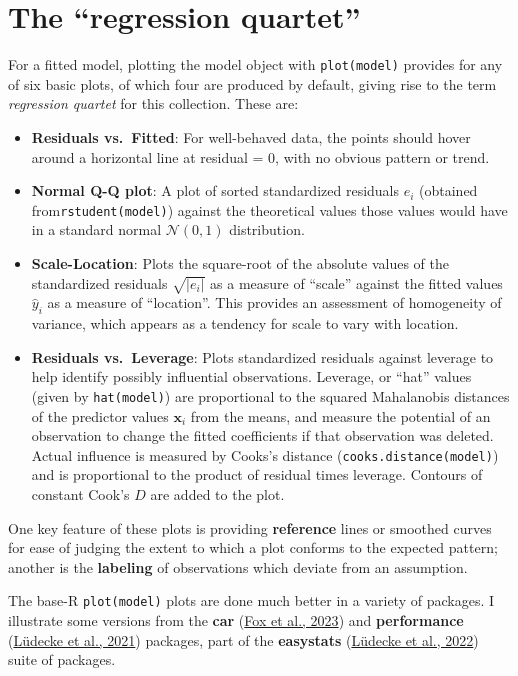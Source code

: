 \documentclass[
  letterpaper,
  10pt,
  krantz2]{krantz}
\begin{document}
\hypertarget{the-regression-quartet}{%
\section{The ``regression quartet''}\label{the-regression-quartet}}

For a fitted model, plotting the model object with \texttt{plot(model)}
provides for any of six basic plots, of which four are produced by
default, giving rise to the term \emph{regression quartet} for this
collection. These are:

\begin{itemize}
\item
  \textbf{Residuals vs.~Fitted}: For well-behaved data, the points
  should hover around a horizontal line at residual = 0, with no obvious
  pattern or trend.
\item
  \textbf{Normal Q-Q plot}: A plot of sorted standardized residuals
  \(e_i\) (obtained from\texttt{rstudent(model)}) against the
  theoretical values those values would have in a standard normal
  \(\mathcal{N}(0, 1)\) distribution.
\item
  \textbf{Scale-Location}: Plots the square-root of the absolute values
  of the standardized residuals \(\sqrt{| e_i |}\) as a measure of
  ``scale'' against the fitted values \(\hat{y}_i\) as a measure of
  ``location''. This provides an assessment of homogeneity of variance,
  which appears as a tendency for scale to vary with location.
\item
  \textbf{Residuals vs.~Leverage}: Plots standardized residuals against
  leverage to help identify possibly influential observations. Leverage,
  or ``hat'' values (given by \texttt{hat(model)}) are proportional to
  the squared Mahalanobis distances of the predictor values
  \(\mathbf{x}_i\) from the means, and measure the potential of an
  observation to change the fitted coefficients if that observation was
  deleted. Actual influence is measured by Cooks's distance
  (\texttt{cooks.distance(model)}) and is proportional to the product of
  residual times leverage. Contours of constant Cook's \(D\) are added
  to the plot.
\end{itemize}

One key feature of these plots is providing \textbf{reference} lines or
smoothed curves for ease of judging the extent to which a plot conforms
to the expected pattern; another is the \textbf{labeling} of
observations which deviate from an assumption.

The base-R \texttt{plot(model)} plots are done much better in a variety
of packages. I illustrate some versions from the \textbf{car}
(\protect\hyperlink{ref-R-car}{Fox et al., 2023}) and
\textbf{performance}
(\protect\hyperlink{ref-Ludecke-etal-performance}{Lüdecke et al., 2021})
packages, part of the \textbf{easystats}
(\protect\hyperlink{ref-R-easystats}{Lüdecke et al., 2022}) suite of
packages.
\end{document}
